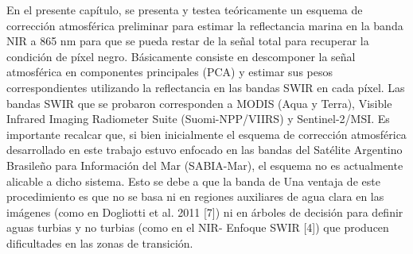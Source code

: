 En el presente capítulo, se presenta y testea teóricamente un esquema de corrección atmosférica preliminar para estimar la reflectancia marina en la banda NIR a 865 nm para que se pueda restar de la señal total para recuperar la condición de píxel negro. Básicamente consiste en descomponer la señal atmosférica en componentes principales (PCA) y estimar sus pesos correspondientes utilizando la reflectancia en las bandas SWIR en cada píxel. Las bandas SWIR que se probaron corresponden a MODIS (Aqua y Terra), Visible Infrared Imaging Radiometer Suite (Suomi-NPP/VIIRS) y Sentinel-2/MSI. Es importante recalcar que, si bien inicialmente el esquema de corrección atmosférica desarrollado en este trabajo estuvo enfocado en las bandas del Satélite Argentino Brasileño para Información del Mar (SABIA-Mar), el esquema no es actualmente alicable a dicho sistema. Esto se debe a que la banda de %
Una ventaja de este procedimiento es que no se basa ni en regiones auxiliares de agua clara en las imágenes (como en Dogliotti et al. 2011 [7]) ni en árboles de decisión para definir aguas turbias y no turbias (como en el NIR- Enfoque SWIR [4]) que producen dificultades en las zonas de transición.


